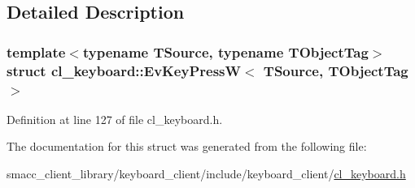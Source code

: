 \subsection{Detailed Description}
\subsubsection*{template$<$typename T\+Source, typename T\+Object\+Tag$>$\newline
struct cl\+\_\+keyboard\+::\+Ev\+Key\+Press\+W$<$ T\+Source, T\+Object\+Tag $>$}



Definition at line 127 of file cl\+\_\+keyboard.\+h.



The documentation for this struct was generated from the following file\+:\begin{DoxyCompactItemize}
\item 
smacc\+\_\+client\+\_\+library/keyboard\+\_\+client/include/keyboard\+\_\+client/\hyperlink{cl__keyboard_8h}{cl\+\_\+keyboard.\+h}\end{DoxyCompactItemize}
